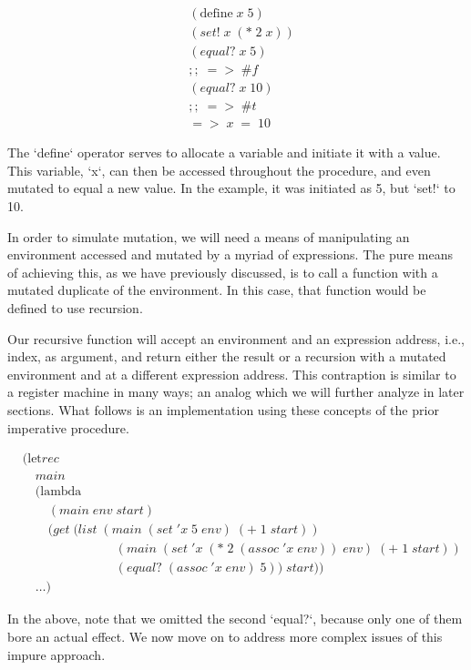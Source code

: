 \begin{align*}
& (\text{define} \; x \; 5)
\\& (set! \; x \; (* \; 2 \; x))
\\& (equal? \; x \; 5)
\\& ;; \; => \; \#f
\\& (equal? \; x \; 10)
\\& ;; \; => \; \#t
\\& => \; x \; = \; 10
\end{align*}

The `define` operator serves to allocate a variable and initiate it with a value. 
This variable, `x`, can then be accessed throughout the procedure, and even mutated 
to equal a new value. In the example, it was initiated as 5, but `set!` to 10.

In order to simulate mutation, we will need a means of manipulating an environment
accessed and mutated by a myriad of expressions. The pure means of achieving this,
as we have previously discussed, is to call a function with a mutated duplicate of
the environment. In this case, that function would be defined to use recursion.

Our recursive function will accept an environment and an expression address, i.e.,
index, as argument, and return either the result or a recursion with a mutated
environment and at a different expression address. This contraption is similar to 
a register machine in many ways; an analog which we will further analyze in later
sections. What follows is an implementation using these concepts of the prior
imperative procedure.

\begin{align*}
& (\text{let}rec \; 
\\& \quad main \; 
\\& \quad (\text{lambda} \; 
\\& \qquad (main \; env \; start)
\\& \qquad (get \; (list \; (main \; (set \; 'x \; 5 \; env) \; (+ \; 1 \; start))
\\& \qquad \qquad \qquad \quad \; (main \; (set \; 'x \; (* \; 2 \; (assoc \; 'x \; env)) \; env) \; (+ \; 1 \; start))
\\& \qquad \qquad \qquad \quad \; (equal? \; (assoc \; 'x \; env) \; 5)) \; start))
\\& \quad \dots)
\end{align*}

In the above, note that we omitted the second `equal?`, because only one of them bore
an actual effect. We now move on to address more complex issues of this impure 
approach.

